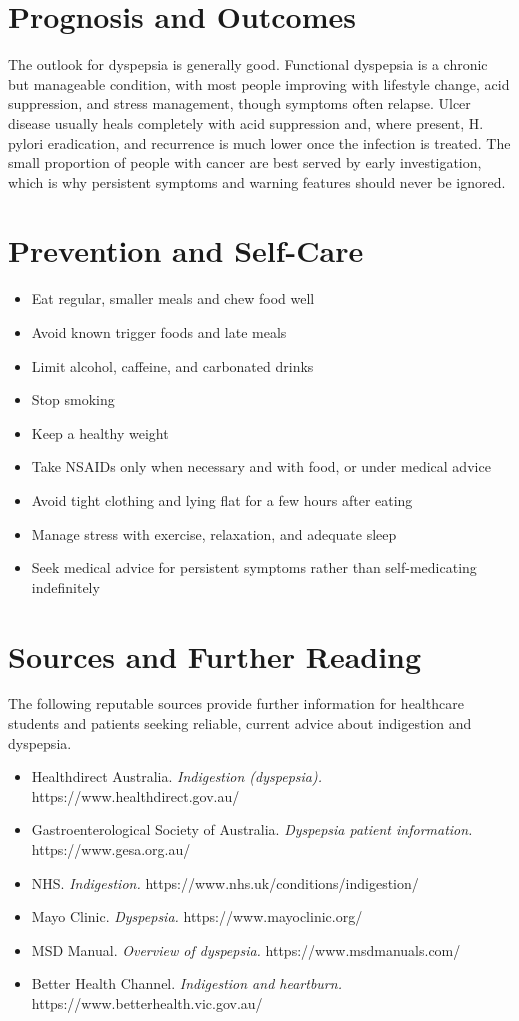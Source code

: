 \section*{Prognosis and Outcomes}
The outlook for dyspepsia is generally good. Functional dyspepsia is a chronic but manageable condition, with most people improving with lifestyle change, acid suppression, and stress management, though symptoms often relapse. Ulcer disease usually heals completely with acid suppression and, where present, H. pylori eradication, and recurrence is much lower once the infection is treated. The small proportion of people with cancer are best served by early investigation, which is why persistent symptoms and warning features should never be ignored.

\section*{Prevention and Self-Care}
\begin{itemize}
    \item Eat regular, smaller meals and chew food well
    \item Avoid known trigger foods and late meals
    \item Limit alcohol, caffeine, and carbonated drinks
    \item Stop smoking
    \item Keep a healthy weight
    \item Take NSAIDs only when necessary and with food, or under medical advice
    \item Avoid tight clothing and lying flat for a few hours after eating
    \item Manage stress with exercise, relaxation, and adequate sleep
    \item Seek medical advice for persistent symptoms rather than self-medicating indefinitely
\end{itemize}

\section*{Sources and Further Reading}
The following reputable sources provide further information for healthcare students and patients seeking reliable, current advice about indigestion and dyspepsia.
\begin{itemize}
    \item Healthdirect Australia. \textit{Indigestion (dyspepsia).} https://www.healthdirect.gov.au/
    \item Gastroenterological Society of Australia. \textit{Dyspepsia patient information.} https://www.gesa.org.au/
    \item NHS. \textit{Indigestion.} https://www.nhs.uk/conditions/indigestion/
    \item Mayo Clinic. \textit{Dyspepsia.} https://www.mayoclinic.org/
    \item MSD Manual. \textit{Overview of dyspepsia.} https://www.msdmanuals.com/
    \item Better Health Channel. \textit{Indigestion and heartburn.} https://www.betterhealth.vic.gov.au/
\end{itemize}
